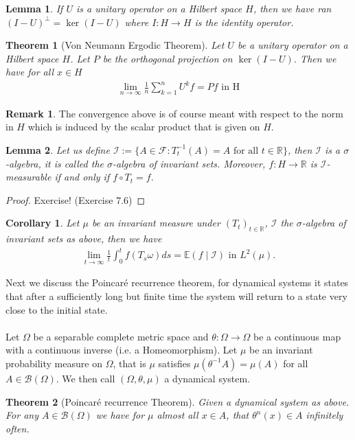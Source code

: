 \documentclass[11pt,a4paper, final]{article}
\newtheorem{lem}{Lemma}[section]
\newtheorem{thm}{Theorem}[section]
\newtheorem{cor}{Corollary}[section]
\theoremstyle{definition}
\newtheorem{rem}{Remark}[section]
\begin{document}
\begin{lem} If $U$ is a unitary operator on a Hilbert space $H$, then we have ran$(I-U)^\perp = \ker(I-U)$ where $I: H \to H$ is the identity operator. 
\end{lem}
\begin{thm}[Von Neumann Ergodic Theorem] Let $U$ be a unitary operator on a Hilbert space $H$. Let $P$ be the orthogonal projection on $\ker(I-U)$. Then we have for all $x \in H$ 
\begin{align*}
\lim_{n \to \infty} \frac{1}{n} \sum_{k=1}^n U^k f = Pf \text{ in H}
\end{align*}
\end{thm}
\begin{rem} The convergence above is of course meant with respect to the norm in $H$ which is induced by the scalar product that is given on $H$. 
\end{rem}
\begin{lem} Let us define $\mathcal{I}:= \lbrace A \in \mathcal{F} : T_t^{-1}(A) = A \text{ for all } t \in \mathbb{R} \rbrace$, then $\mathcal{I}$ is a $\sigma$-algebra, it is called the $\sigma$-algebra of invariant sets. Moreover, $f: H \to \mathbb{R}$ is $\mathcal{I}$-measurable if and only if $f \circ T_t = f$. 
\end{lem}
\begin{proof}
Exercise! (Exercise 7.6)
\end{proof}
\begin{cor} Let $\mu$ be an invariant measure under $(T_t)_{t \in \mathbb{R}}$, $\mathcal{I}$ the $\sigma$-algebra of invariant sets as above, then we have 
\begin{align*}
\lim_{t \to \infty} \frac{1}{t} \int_0^t f (T_s \omega) ds = \mathbb{E}(f \mid \mathcal{I}) \text{ in } L^2( \mu).
\end{align*}
\end{cor}
\noindent Next we discuss the Poincaré recurrence theorem, for dynamical systems it states that  after a sufficiently long but finite time the system will return to a state very close to the initial state. 
\\\\
Let $\Omega$ be a separable complete metric space and $\theta: \Omega \to \Omega$ be a continuous map with a continuous inverse (i.e. a Homeomorphism). Let $\mu$ be an invariant probability measure on $\Omega$, that is $\mu$ satisfies $\mu( \theta^{-1} A)= \mu(A)$ for all $A \in \mathcal{B}( \Omega)$. We then call $( \Omega, \theta, \mu)$ a dynamical system. 
\begin{thm}[Poincaré recurrence Theorem] Given a dynamical system as above. For any $A \in \mathcal{B}(\Omega)$ we have for $\mu$ almost all $x \in A$, that $\theta^n(x) \in A$ infinitely often. 

\end{thm}
\end{document}
